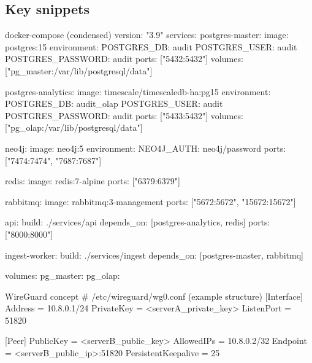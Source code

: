 \documentclass[11pt,a4paper]{article}
\begin{document}
\subsection{Key snippets}
\begin{codeblock}[language={}]{docker-compose (condensed)}
version: "3.9"
services:
  postgres-master:
    image: postgres:15
    environment:
      POSTGRES_DB: audit
      POSTGRES_USER: audit
      POSTGRES_PASSWORD: audit
    ports: ["5432:5432"]
    volumes: ["pg_master:/var/lib/postgresql/data"]

  postgres-analytics:
    image: timescale/timescaledb-ha:pg15
    environment:
      POSTGRES_DB: audit_olap
      POSTGRES_USER: audit
      POSTGRES_PASSWORD: audit
    ports: ["5433:5432"]
    volumes: ["pg_olap:/var/lib/postgresql/data"]

  neo4j:
    image: neo4j:5
    environment:
      NEO4J_AUTH: neo4j/password
    ports: ["7474:7474", "7687:7687"]

  redis:
    image: redis:7-alpine
    ports: ["6379:6379"]

  rabbitmq:
    image: rabbitmq:3-management
    ports: ["5672:5672", "15672:15672"]

  api:
    build: ./services/api
    depends_on: [postgres-analytics, redis]
    ports: ["8000:8000"]

  ingest-worker:
    build: ./services/ingest
    depends_on: [postgres-master, rabbitmq]

volumes:
  pg_master:
  pg_olap:
\end{codeblock}

\begin{codeblock}[language={}]{WireGuard concept}
# /etc/wireguard/wg0.conf (example structure)
[Interface]
Address = 10.8.0.1/24
PrivateKey = <serverA_private_key>
ListenPort = 51820

[Peer]
PublicKey = <serverB_public_key>
AllowedIPs = 10.8.0.2/32
Endpoint = <serverB_public_ip>:51820
PersistentKeepalive = 25
\end{codeblock}
\end{document}
